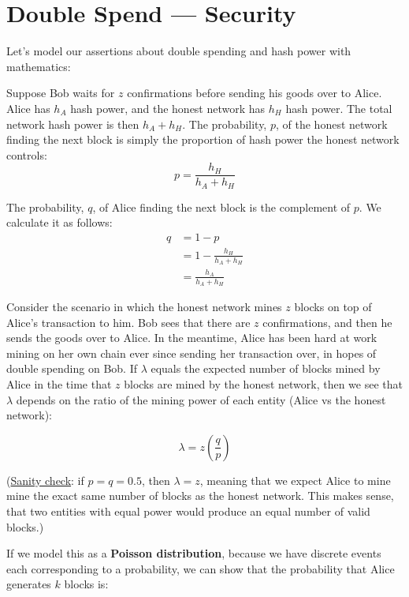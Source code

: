 \documentclass[full.tex]{subfiles}
\begin{document}
   \section*{Double Spend --- Security}
   
   \noindent Let's model our assertions about double spending and hash power with mathematics:
   
   Suppose Bob waits for $z$ confirmations before sending his goods over to Alice. Alice has $h_A$ hash power, and the honest network has $h_H$ hash power. The total network hash power is then $h_A + h_H$. The probability, $p$, of the honest network finding the next block is simply the proportion of hash power the honest network controls:
   $$p = \frac{h_H}{h_A + h_H} $$
   
   \noindent The probability, $q$, of Alice finding the next block is the complement of $p$. We calculate it as follows:
   \begin{equation*}
       \begin{split}
           q &= 1-p \\
           &= 1 - \frac{h_H}{h_A + h_H} \\
           &= \frac{h_A}{h_A + h_H}
       \end{split}
   \end{equation*}
   
   Consider the scenario in which the honest network mines $z$ blocks on top of Alice's transaction to him. Bob sees that there are $z$ confirmations, and then he sends the goods over to Alice. In the meantime, Alice has been hard at work mining on her own chain ever since sending her transaction over, in hopes of double spending on Bob. If $\lambda$ equals the expected number of blocks mined by Alice in the time that $z$ blocks are mined by the honest network, then we see that $\lambda$ depends on the ratio of the mining power of each entity (Alice vs the honest network):
   
   $$\lambda = z(\frac{q}{p})$$
   
   (\underline{Sanity check}: if $p = q = 0.5$, then $\lambda = z$, meaning that we expect Alice to mine mine the exact same number of blocks as the honest network. This makes sense, that two entities with equal power would produce an equal number of valid blocks.)
   
   If we model this as a \textbf{Poisson distribution}, because we have discrete events each corresponding to a probability, we can show that the probability that Alice generates $k$ blocks is:
   
\end{document}
